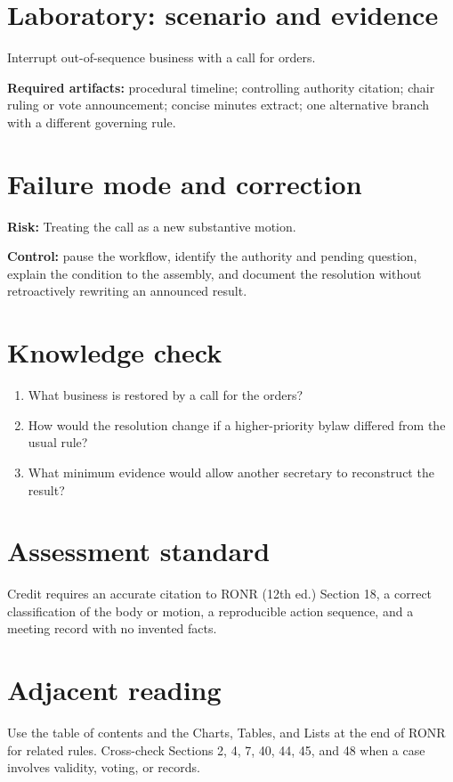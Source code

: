 \documentclass[11pt]{article}
\begin{document}
\section{Laboratory: scenario and evidence}
Interrupt out-of-sequence business with a call for orders.

\textbf{Required artifacts:} procedural timeline; controlling authority citation; chair ruling or vote announcement; concise minutes extract; one alternative branch with a different governing rule.

\section{Failure mode and correction}
\textbf{Risk:} Treating the call as a new substantive motion.

\textbf{Control:} pause the workflow, identify the authority and pending question, explain the condition to the assembly, and document the resolution without retroactively rewriting an announced result.

\section{Knowledge check}
\begin{enumerate}[leftmargin=*,itemsep=4pt]
\item What business is restored by a call for the orders?
\item How would the resolution change if a higher-priority bylaw differed from the usual rule?
\item What minimum evidence would allow another secretary to reconstruct the result?
\end{enumerate}

\section{Assessment standard}
Credit requires an accurate citation to RONR (12th ed.) Section 18, a correct classification of the body or motion, a reproducible action sequence, and a meeting record with no invented facts.

\section{Adjacent reading}
Use the table of contents and the Charts, Tables, and Lists at the end of RONR for related rules. Cross-check Sections 2, 4, 7, 40, 44, 45, and 48 when a case involves validity, voting, or records.
\end{document}
